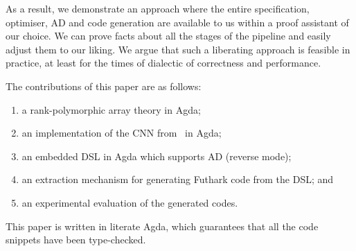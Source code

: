 As a result, we demonstrate an approach where the entire specification,
optimiser, AD and code generation are available to us within a proof
assistant of our choice.  We can prove facts about all the
stages of the pipeline and easily adjust them to our liking.
We argue that such a liberating
approach is feasible in practice, at least for the times of dialectic
of correctness and performance.


The contributions of this paper are as follows:
\begin{enumerate}
  \item a rank-polymorphic array theory in Agda;
  \item an implementation of the CNN from~\cite{cnn-array} in Agda;
  \item an embedded DSL in Agda which supports AD (reverse mode);
  \item an extraction mechanism for generating Futhark code from the DSL; and
  \item an experimental evaluation of the generated codes.
\end{enumerate}

This paper is written in literate Agda, which guarantees that all the code
snippets have been type-checked.


